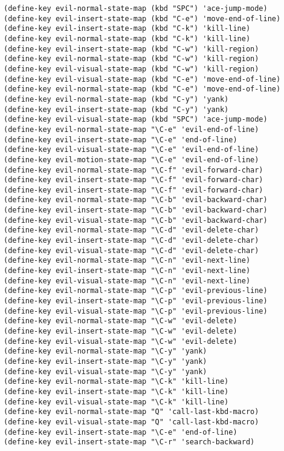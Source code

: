 \documentclass[11pt]{article}
\begin{document}
\begin{verbatim}
(define-key evil-normal-state-map (kbd "SPC") 'ace-jump-mode)
(define-key evil-insert-state-map (kbd "C-e") 'move-end-of-line)
(define-key evil-insert-state-map (kbd "C-k") 'kill-line)
(define-key evil-normal-state-map (kbd "C-k") 'kill-line)
(define-key evil-insert-state-map (kbd "C-w") 'kill-region)
(define-key evil-normal-state-map (kbd "C-w") 'kill-region)
(define-key evil-visual-state-map (kbd "C-w") 'kill-region)
(define-key evil-visual-state-map (kbd "C-e") 'move-end-of-line)
(define-key evil-normal-state-map (kbd "C-e") 'move-end-of-line)
(define-key evil-normal-state-map (kbd "C-y") 'yank)
(define-key evil-insert-state-map (kbd "C-y") 'yank)
(define-key evil-visual-state-map (kbd "SPC") 'ace-jump-mode)
(define-key evil-normal-state-map "\C-e" 'evil-end-of-line)
(define-key evil-insert-state-map "\C-e" 'end-of-line)
(define-key evil-visual-state-map "\C-e" 'evil-end-of-line)
(define-key evil-motion-state-map "\C-e" 'evil-end-of-line)
(define-key evil-normal-state-map "\C-f" 'evil-forward-char)
(define-key evil-insert-state-map "\C-f" 'evil-forward-char)
(define-key evil-insert-state-map "\C-f" 'evil-forward-char)
(define-key evil-normal-state-map "\C-b" 'evil-backward-char)
(define-key evil-insert-state-map "\C-b" 'evil-backward-char)
(define-key evil-visual-state-map "\C-b" 'evil-backward-char)
(define-key evil-normal-state-map "\C-d" 'evil-delete-char)
(define-key evil-insert-state-map "\C-d" 'evil-delete-char)
(define-key evil-visual-state-map "\C-d" 'evil-delete-char)
(define-key evil-normal-state-map "\C-n" 'evil-next-line)
(define-key evil-insert-state-map "\C-n" 'evil-next-line)
(define-key evil-visual-state-map "\C-n" 'evil-next-line)
(define-key evil-normal-state-map "\C-p" 'evil-previous-line)
(define-key evil-insert-state-map "\C-p" 'evil-previous-line)
(define-key evil-visual-state-map "\C-p" 'evil-previous-line)
(define-key evil-normal-state-map "\C-w" 'evil-delete)
(define-key evil-insert-state-map "\C-w" 'evil-delete)
(define-key evil-visual-state-map "\C-w" 'evil-delete)
(define-key evil-normal-state-map "\C-y" 'yank)
(define-key evil-insert-state-map "\C-y" 'yank)
(define-key evil-visual-state-map "\C-y" 'yank)
(define-key evil-normal-state-map "\C-k" 'kill-line)
(define-key evil-insert-state-map "\C-k" 'kill-line)
(define-key evil-visual-state-map "\C-k" 'kill-line)
(define-key evil-normal-state-map "Q" 'call-last-kbd-macro)
(define-key evil-visual-state-map "Q" 'call-last-kbd-macro)
(define-key evil-insert-state-map "\C-e" 'end-of-line)
(define-key evil-insert-state-map "\C-r" 'search-backward)
\end{verbatim}
\end{document}
